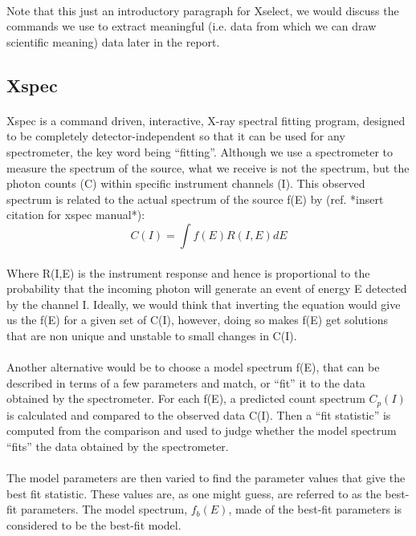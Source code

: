 \documentclass[a4paper,twoside]{report}
\numberwithin{equation}{section}
\begin{document}
\paragraph{}
Note that this just an introductory paragraph for Xselect, we would discuss the commands we use to extract meaningful (i.e. data from which we can draw scientific meaning) data later in the report.
\subsection{Xspec}
\paragraph{}
Xspec is a command driven, interactive, X-ray spectral fitting program, designed to be completely detector-independent so that it can be used for any spectrometer, the key word being “fitting”. Although we use a spectrometer to measure the spectrum of the source, what we receive is not the spectrum, but the photon counts (C) within specific instrument channels (I). This observed spectrum is related to the actual spectrum of the source f(E) by (ref. *insert citation for xspec manual*): 
\begin{equation}
C(I)=\int{f(E)R(I,E)dE}
\end{equation}
\paragraph{}
Where R(I,E) is the instrument response and hence is proportional to the probability that the incoming photon will generate an event of energy E detected by the channel I. Ideally, we would think that inverting the equation would give us the f(E) for a given set of C(I), however, doing so makes f(E) get solutions that are non unique and unstable to small changes in C(I). 
\paragraph{}
Another alternative would be to choose a model spectrum f(E), that can be described in terms of a few parameters and match, or “fit” it to the data obtained by the spectrometer. For each f(E), a predicted count spectrum $C_p (I)$ is calculated and compared to the observed data C(I). Then a “fit statistic” is computed from the comparison and used to judge whether the model spectrum “fits” the data obtained by the spectrometer.
\paragraph{}
The model parameters are then varied to find the parameter values that give the best fit statistic. These values are, as one might guess, are referred to as the best-fit parameters. The model spectrum, $f_b (E)$, made of the best-fit parameters is considered to be the best-fit model.
\end{document}
